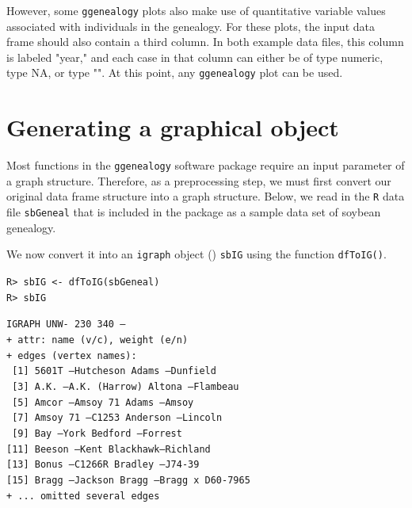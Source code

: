 \documentclass[11pt,a4paper,oldfontcommands,openany]{memoir}
\DeclareRobustCommand{\mybox}[2][gray!15]{%
\begin{tcolorbox}[   %
        breakable,
        left=0pt,
        right=0pt,
        top=0pt,
        bottom=0pt,
        colback=#1,
        colframe=#1,
        width=\dimexpr\textwidth\relax, 
        enlarge left by=0mm,
        boxsep=5pt,
        arc=0pt,outer arc=0pt,
        ]
        #2
\end{tcolorbox}
}
\numberwithin{equation}{section} %
\newcommand{\code}[1]{{\texttt{#1}}}
\newcommand{\pkg}[1]{{\texttt{#1}}}
\begin{document}
However, some \pkg{ggenealogy} plots also make use of quantitative variable values associated with individuals in the genealogy. For these plots, the input data frame should also contain a third column. In both example data files, this column is labeled "year," and each case in that column can either be of type numeric, type NA, or type "". At this point, any \pkg{ggenealogy} plot can be used.

\section{Generating a graphical object}

Most functions in the \pkg{ggenealogy} software package require an input parameter of a graph structure. Therefore, as a preprocessing step, we must first convert our original data frame structure into a graph structure. Below, we read in the \pkg{R} data file \code{sbGeneal} that is included in the package as a sample data set of soybean genealogy.

We now convert it into an \pkg{igraph} object (\citealt{igraph}) \code{sbIG} using the function \code{dfToIG()}.

\mybox{
\texttt{R> sbIG <- dfToIG(sbGeneal)}\\
\texttt{R> sbIG}
}

\mybox[green!10]{
\texttt{IGRAPH UNW- 230 340 -- }\\
\texttt{+ attr: name (v/c), weight (e/n)}\\
\texttt{+ edges (vertex names):}\\
\texttt{ [1] 5601T    --Hutcheson        Adams    --Dunfield} \\       
\texttt{ [3] A.K.     --A.K. (Harrow)    Altona   --Flambeau} \\       
\texttt{ [5] Amcor    --Amsoy 71         Adams    --Amsoy } \\         
\texttt{ [7] Amsoy 71 --C1253            Anderson --Lincoln   } \\     
\texttt{ [9] Bay      --York             Bedford  --Forrest  }\\       
\texttt{[11] Beeson   --Kent             Blackhawk--Richland } \\      
\texttt{[13] Bonus    --C1266R           Bradley  --J74-39  } \\       
\texttt{[15] Bragg    --Jackson          Bragg    --Bragg x D60-7965}\\
\texttt{+ ... omitted several edges}
}
\end{document}
